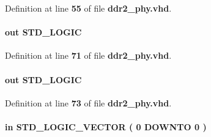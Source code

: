 Definition at line {\bf 55} of file {\bf ddr2\+\_\+phy.\+vhd}.

\paragraph[{ctl\+\_\+cal\+\_\+success}]{ {\bfseries \textcolor{keywordflow}{out}\textcolor{vhdlchar}{ }} {\bfseries \textcolor{comment}{S\+T\+D\+\_\+\+L\+O\+G\+IC}\textcolor{vhdlchar}{ }} \hspace{0.3cm}{\ttfamily [Port]}}\label{classddr2__phy_aa793d6d19c9c96834926327a3c07abc7}


Definition at line {\bf 71} of file {\bf ddr2\+\_\+phy.\+vhd}.

\paragraph[{ctl\+\_\+cal\+\_\+warning}]{ {\bfseries \textcolor{keywordflow}{out}\textcolor{vhdlchar}{ }} {\bfseries \textcolor{comment}{S\+T\+D\+\_\+\+L\+O\+G\+IC}\textcolor{vhdlchar}{ }} \hspace{0.3cm}{\ttfamily [Port]}}\label{classddr2__phy_aee6d5e09da5be62a24360254cd48279e}


Definition at line {\bf 73} of file {\bf ddr2\+\_\+phy.\+vhd}.

\paragraph[{ctl\+\_\+cas\+\_\+n}]{ {\bfseries \textcolor{keywordflow}{in}\textcolor{vhdlchar}{ }} {\bfseries \textcolor{comment}{S\+T\+D\+\_\+\+L\+O\+G\+I\+C\+\_\+\+V\+E\+C\+T\+OR}\textcolor{vhdlchar}{ }\textcolor{vhdlchar}{(}\textcolor{vhdlchar}{ }\textcolor{vhdlchar}{ } \textcolor{vhdldigit}{0} \textcolor{vhdlchar}{ }\textcolor{keywordflow}{D\+O\+W\+N\+TO}\textcolor{vhdlchar}{ }\textcolor{vhdlchar}{ } \textcolor{vhdldigit}{0} \textcolor{vhdlchar}{ }\textcolor{vhdlchar}{)}\textcolor{vhdlchar}{ }} \hspace{0.3cm}{\ttfamily [Port]}}\label{classddr2__phy_a9ef0cc681bfb94156d1068ce3d2d70b0}


